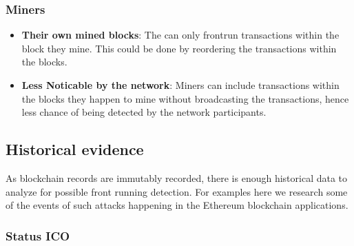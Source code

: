 \subsubsection{Miners}

\begin{itemize}
\item{\textbf{Their own mined blocks}: The can only frontrun transactions within the block they mine. This could be done by reordering the transactions within the blocks.}

\item{\textbf{Less Noticable by the network}: Miners can include transactions within the blocks they happen to mine without broadcasting the transactions, hence less chance of being detected by the network participants.} 
\end{itemize}



\subsection{Historical evidence}
As blockchain records are immutably recorded, there is enough historical data to analyze for possible front running detection. For examples here we research some of the events of such attacks happening in the Ethereum blockchain applications.




\subsubsection{Status ICO} %




